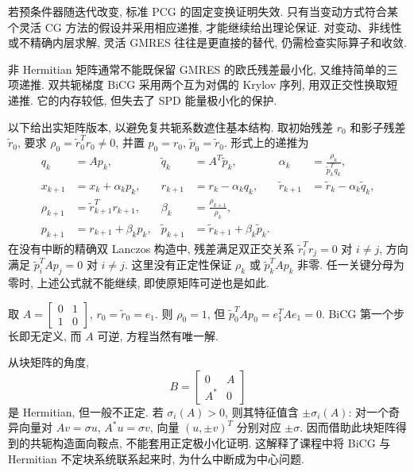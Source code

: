 若预条件器随迭代改变, 标准 PCG 的固定变换证明失效. 只有当变动方式符合某个灵活 CG 方法的假设并采用相应递推, 才能继续给出理论保证. 对变动、非线性或不精确内层求解, 灵活 GMRES 往往是更直接的替代, 仍需检查实际算子和收敛.

非 Hermitian 矩阵通常不能既保留 GMRES 的欧氏残差最小化, 又维持简单的三项递推. 双共轭梯度 BiCG 采用两个互为对偶的 Krylov 序列, 用双正交性换取短递推. 它的内存较低, 但失去了 SPD 能量极小化的保护.

以下给出实矩阵版本, 以避免复共轭系数遮住基本结构. 取初始残差 $r_0$ 和影子残差 $\widetilde r_0$, 要求 $\rho_0=\widetilde r_0^Tr_0\ne0$, 并置 $p_0=r_0$, $\widetilde p_0=\widetilde r_0$. 形式上的递推为
\begin{equation}\label{eq:bicg}
\begin{aligned}
q_k&=Ap_k,&\widetilde q_k&=A^T\widetilde p_k,
&\alpha_k&=\frac{\rho_k}{\widetilde p_k^Tq_k},\\
x_{k+1}&=x_k+\alpha_kp_k,&
r_{k+1}&=r_k-\alpha_kq_k,&
\widetilde r_{k+1}&=\widetilde r_k-\alpha_k\widetilde q_k,\\
\rho_{k+1}&=\widetilde r_{k+1}^Tr_{k+1},&
\beta_k&=\frac{\rho_{k+1}}{\rho_k},\\
p_{k+1}&=r_{k+1}+\beta_kp_k,&
\widetilde p_{k+1}&=\widetilde r_{k+1}+\beta_k\widetilde p_k.
\end{aligned}
\end{equation}
在没有中断的精确双 Lanczos 构造中, 残差满足双正交关系 $\widetilde r_i^Tr_j=0$ 对 $i\ne j$, 方向满足 $\widetilde p_i^TAp_j=0$ 对 $i\ne j$. 这里没有正定性保证 $\rho_k$ 或 $\widetilde p_k^TAp_k$ 非零. 任一关键分母为零时, 上述公式就不能继续, 即使原矩阵可逆也是如此.

\begin{example}
取 $A=\begin{bmatrix}0&1\\1&0\end{bmatrix}$, $r_0=\widetilde r_0=e_1$. 则 $\rho_0=1$, 但 $\widetilde p_0^TAp_0=e_1^TAe_1=0$. BiCG 第一个步长即无定义, 而 $A$ 可逆, 方程当然有唯一解.
\end{example}
从块矩阵的角度,
\[
B=\begin{bmatrix}0&A\\A^*&0\end{bmatrix}
\]
是 Hermitian, 但一般不正定. 若 $\sigma_i(A)>0$, 则其特征值含 $\pm\sigma_i(A)$: 对一个奇异向量对 $Av=\sigma u$, $A^*u=\sigma v$, 向量 $(u,\pm v)^T$ 分别对应 $\pm\sigma$. 因而借助此块矩阵得到的共轭构造面向鞍点, 不能套用正定极小化证明. 这解释了课程中将 BiCG 与 Hermitian 不定块系统联系起来时, 为什么中断成为中心问题.

